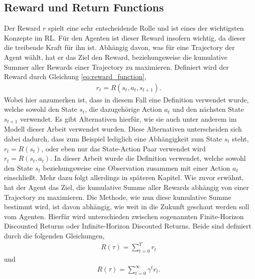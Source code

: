 \documentclass[]{iat}
\begin{document}
\subsection{Reward und Return Functions} \label{sec:reward}
Der Reward $r$ spielt eine sehr entscheidende Rolle und ist eines der wichtigsten Konzepte im RL. Für den Agenten ist dieser Reward insofern wichtig, da dieser die treibende Kraft für ihn ist. Abhängig davon, was für eine Trajectory der Agent wählt, hat er das Ziel den Reward, beziehungsweise die kumulative Summer aller Rewards einer Trajectory zu maximieren. Definiert wird der Reward durch Gleichung \ref{eq:reward_function},
\begin{align}
    r_t = R(s_t, a_t, s_{t+1}) \label{eq:reward_function}.
\end{align}
Wobei hier anzumerken ist, dass in diesem Fall eine Definition verwendet wurde, welche sowohl den State $s_t$, die dazugehörige Action $a_t$ und den nächsten State $s_{t+1}$ verwendet. Es gibt Alternativen hierfür, wie sie auch unter anderem im Modell dieser Arbeit verwendet wurden. Diese Alternativen unterscheiden sich dabei dadurch, dass zum Beispiel lediglich eine Abhängigkeit zum State $s_t$ steht, $r_t = R(s_t)$, oder eben nur das State-Action Paar verwendet wird $r_t = R(s_t, a_t)$. In dieser Arbeit wurde die Definition verwendet, welche sowohl den State $s_t$ beziehungsweise eine Observation zusammen mit einer Action $a_t$ einschließt. Mehr dazu folgt allerdings in späteren Kapitel. Wie zuvor erwähnt, hat der Agent das Ziel, die kumulative Summe aller Rewards abhängig von einer Trajectory zu maximieren. Die Methode, wie nun diese kumulative Summe bestimmt wird, ist davon abhängig, wie weit in die Zukunft geschaut werden soll vom Agenten. Hierfür wird unterschieden zwischen sogenannten Finite-Horizon Discounted Returns oder Infinite-Horizon Discouted Returns. Beide sind definiert durch die folgenden Gleichungen,
\begin{align}
    R(\tau) = \sum_{t = 0}^{T} r_t \label{eq:finite_horizon_undiscounted}
\end{align}
und
\begin{align}
    R(\tau) = \sum_{t = 0}^{\infty} \gamma^t r_t. \label{eq:infinite_horizon_discounted}
\end{align}
\end{document}
